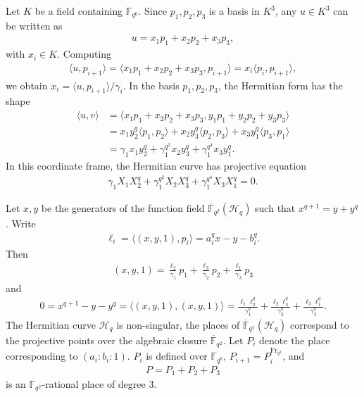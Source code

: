 \documentclass[11pt]{amsart}
\theoremstyle{plain}
\theoremstyle{definition}
\theoremstyle{remark}
\newcommand{\Frob}{{\mathrm{Fr}_{q^2}}}
\begin{document}
Let $K$ be a field containing $\mathbb{F}_{q^6}$. Since $p_1,p_2,p_3$ is a basis in $K^3$, any $u\in K^3$ can be written as
\begin{align*} %
u=x_1p_1+x_2p_2+x_3p_3,
\end{align*}
with $x_i\in K$. Computing
\begin{align*}
\langle u, p_{i+1} \rangle = \langle x_1p_1+x_2p_2+x_3p_3, p_{i+1} \rangle = x_i \langle p_{i}, p_{i+1} \rangle,
\end{align*}
we obtain $x_i=\langle u,p_{i+1} \rangle / \gamma_i$. In the basis $p_1,p_2,p_3$, the Hermitian form has the shape
\begin{align*}
\langle u,v \rangle &= \langle x_1p_1+x_2p_2+x_3p_3,y_1p_1+y_2p_2+y_3p_3 \rangle \\
&= x_1y_2^q \langle p_1,p_2 \rangle + x_2y_3^q \langle p_2,p_3 \rangle + x_3y_1^q \langle p_3,p_1 \rangle\\
&=\gamma_1 x_1y_2^q+\gamma_1^{q^2} x_2y_3^q+\gamma_1^{q^4} x_3y_1^q.
\end{align*}
In this coordinate frame, the Hermitian curve has projective equation
\begin{align*} %
\gamma_1 X_1X_2^q+\gamma_1^{q^2} X_2X_3^q+\gamma_1^{q^4} X_3X_1^q=0.
\end{align*}

Let $x,y$ be the generators of the function field $\overline{\mathbb{F}}_{q^2}(\mathscr{H}_q)$ such that $x^{q+1}=y+y^q$. Write
\begin{align*} %
\ell_i=\langle (x,y,1), p_i \rangle = a_i^qx-y-b_i^q.
\end{align*}
Then
\begin{align*} %
(x,y,1)=\frac{\ell_{2}}{\gamma_1} p_1+\frac{\ell_{3}}{\gamma_2} p_2+\frac{\ell_{1}}{\gamma_3} p_3
\end{align*}
and
\begin{align} \label{eq:ell-q-lin-dep}
0=x^{q+1}-y-y^q = \langle (x,y,1), (x,y,1) \rangle = \frac{\ell_1\ell_{2}^q}{\gamma_1^q} + \frac{\ell_2\ell_{3}^q}{\gamma_2^q} + \frac{\ell_3\ell_{1}^q}{\gamma_3^q}.
\end{align}
The Hermitian curve $\mathscr{H}_q$ is non-singular, the places of $\overline{\mathbb{F}}_{q^2}(\mathscr{H}_q)$ correspond to the projective points over the algebraic closure $\overline{\mathbb{F}}_{q^2}$. Let $P_i$ denote the place corresponding to $(a_i:b_i:1)$. $P_i$ is defined over $\mathbb{F}_{q^6}$, $P_{i+1}=P_i^\Frob$, and 
\begin{align*} %
P=P_1+P_2+P_3
\end{align*}
is an $\mathbb{F}_{q^2}$-rational place of degree $3$. 
\end{document}
